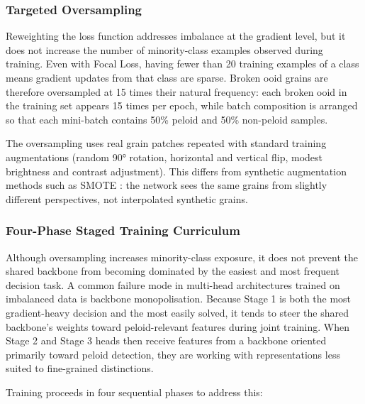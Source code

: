\documentclass[a4paper,fleqn]{cas-dc}
\begin{document}
\subsubsection{Targeted Oversampling}
\label{sec:oversampling}

Reweighting the loss function addresses imbalance at the gradient level, but it does not increase the number of minority-class examples observed during training. Even with Focal Loss, having fewer than 20 training examples of a class means gradient updates from that class are sparse. Broken ooid grains are therefore oversampled at 15 times their natural frequency: each broken ooid in the training set appears 15 times per epoch, while batch composition is arranged so that each mini-batch contains 50\% peloid and 50\% non-peloid samples.

The oversampling uses real grain patches repeated with standard training augmentations (random 90° rotation, horizontal and vertical flip, modest brightness and contrast adjustment). This differs from synthetic augmentation methods such as SMOTE \citep{chawla2002smote}: the network sees the same grains from slightly different perspectives, not interpolated synthetic grains.

\subsubsection{Four-Phase Staged Training Curriculum}
\label{sec:staged_training}

Although oversampling increases minority-class exposure, it does not prevent the shared backbone from becoming dominated by the easiest and most frequent decision task. A common failure mode in multi-head architectures trained on imbalanced data is backbone monopolisation. Because Stage 1 is both the most gradient-heavy decision and the most easily solved, it tends to steer the shared backbone's weights toward peloid-relevant features during joint training. When Stage 2 and Stage 3 heads then receive features from a backbone oriented primarily toward peloid detection, they are working with representations less suited to fine-grained distinctions.

Training proceeds in four sequential phases to address this:
\end{document}
